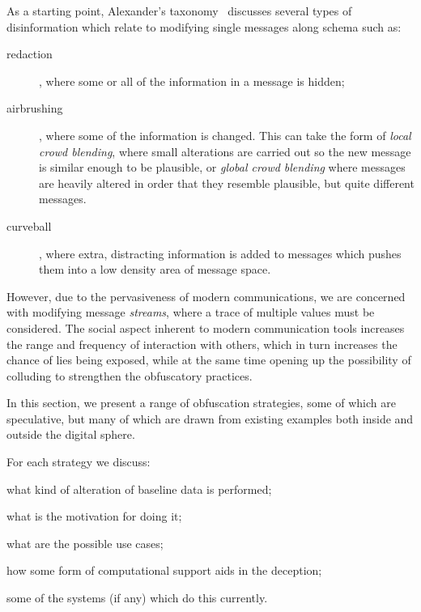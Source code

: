 \documentclass{IOS-Book-Article}     %
\begin{document}
As a starting point, Alexander's taxonomy~\cite{alexander2010Disinformation}
discusses several types of disinformation which relate to modifying single messages along schema such
as:
\begin{description}
  \item[redaction], where some or all of the information in a message is
  hidden;
  \item[airbrushing], where some of the information is changed. This can take
  the form of \emph{local crowd blending}, where small alterations are carried
  out so the new message is similar enough to be plausible, or
  \emph{global crowd blending} where messages are heavily altered in order that
  they resemble plausible, but quite different messages.
  \item[curveball], where extra, distracting information is added to messages
  which pushes them into a low density area of message space.
\end{description}
However, due to
the pervasiveness of modern communications, we are concerned with modifying
message \emph{streams}, where a trace of multiple values must be considered.
The social aspect inherent to modern communication tools increases the 
range and frequency of interaction with others, which in turn increases the 
chance of lies being exposed, while at the same time opening up the possibility
of colluding to strengthen the obfuscatory practices. 

In this section, we present a range of obfuscation strategies, some of which are
speculative, but many of which are drawn from existing examples both inside and
outside the digital sphere.

For each strategy we discuss: \begin{inparaenum}
\item what kind of alteration of baseline data is performed;
\item what is the motivation for doing it; 
\item what are the possible use cases;
\item how some form of computational support aids in the deception;
\item some of the systems (if any) which do this currently.
\end{inparaenum}
\end{document}
